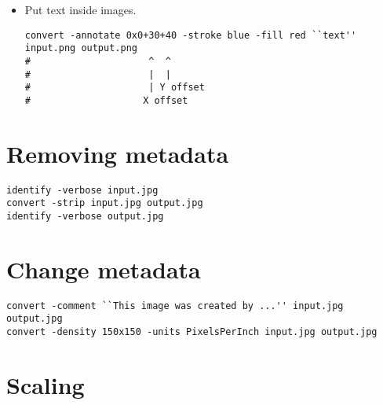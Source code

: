 \begin{itemize}
\item Put text inside images.
\begin{lstlisting}
convert -annotate 0x0+30+40 -stroke blue -fill red ``text'' input.png output.png
#                     ^  ^
#                     |  |
#                     | Y offset
#                    X offset      
\end{lstlisting}

\end{itemize}


\section{Removing metadata}

\begin{lstlisting}
identify -verbose input.jpg
convert -strip input.jpg output.jpg
identify -verbose output.jpg
\end{lstlisting}


\section{Change metadata}

\begin{lstlisting}
convert -comment ``This image was created by ...'' input.jpg output.jpg
convert -density 150x150 -units PixelsPerInch input.jpg output.jpg
\end{lstlisting}


\section{Scaling}

